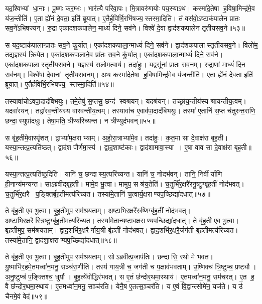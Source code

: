 यद॒श्विभ्यां धा॒नाः।
पू॒ष्णः क॑र॒म्भः।
भार॑त्यै परिवा॒पः।
मि॒त्रावरु॑णयोः पय॒स्याऽथ॑।
कस्मा॑दे॒तेषा ह॒विषा॒मिन्द्र॑मे॒व य॑ज॒न्तीति॑।
ए॒ता ह्ये॑नं दे॒वता॒ इति॑ ब्रूयात्।
ए॒तैर्\mbox{}ह॒विर्भि॒\-रभि॑षज्य॒स्तस्मा॒दिति॑।
तं वस॑वो॒ऽष्टाक॑पालेन प्रातः सव॒ने॑ऽभिषज्यन्।
रु॒द्रा एका॑दशकपालेन॒ माध्यं॑ दिने॒ सव॑ने।
विश्वे॑ दे॒वा द्वाद॑शकपालेन तृतीयसव॒ने॥५३॥

स यद॒ष्टाक॑पालान्प्रातः सव॒ने कु॒र्यात्।
एका॑दशकपाला॒न्माध्यं॑ दिने॒ सव॑ने।
द्वाद॑शकपालास्तृतीयसव॒ने।
विलो॑म॒ तद्य॒ज्ञस्य॑ क्रियेत।
एका॑दशकपालाने॒व प्रा॑तः सव॒ने कु॑र्यात्।
एका॑दशकपाला॒न्माध्यं॑ दिने॒ सव॑ने।
एका॑दशकपाला\-स्तृतीयसव॒ने।
य॒ज्ञस्य॑ सलोम॒त्वाय॑।
तदा॑हुः।
यद्वसू॑नां प्रातः सव॒नम्।
रु॒द्राणां॒ माध्यं॑ दिन॒ सव॑नम्।
विश्वे॑षां दे॒वानां तृतीयसव॒नम्।
अथ॒ कस्मा॑दे॒तेषा ह॒विषा॒मिन्द्र॑मे॒व य॑ज॒न्तीति॑।
ए॒ता ह्ये॑नं दे॒वता॒ इति॑ ब्रूयात्।
ए॒तैर्\-\mbox{}ह॒विर्भि॒रभि॑\-षज्य॒ स्तस्मा॒दिति॑॥५४॥\anuvakamend[ए॒क॒वि॒श आ॑हुस्तृतीयसव॒ने प्रा॑तः सव॒नं पञ्च॑ च]

तस्यावा॑चोऽवपा॒दाद॑बिभयुः।
तमे॒तेषु॑ स॒प्तसु॒ छन्द॑ स्वश्रयन्।
यदश्र॑यन्।
तच्छ्रा॑य॒न्तीय॑स्य श्रायन्तीय॒त्वम्।
यदवा॑रयन्।
तद्वा॑रव॒न्तीय॑स्य वारवन्तीय॒त्वम्।
तस्यावा॑च ए॒वाव॑पा॒दाद॑बिभयुः।
तस्मा॑ ए॒तानि॑ स॒प्त च॑तुरुत्त॒राणि॒ छन्दा॒स्युपा॑दधुः।
तेषा॒मति॒ त्रीण्य॑रिच्यन्त।
न त्रीण्युद॑भवन्॥५५॥

स बृ॑ह॒तीमे॒वास्पृ॑शत्।
द्वाभ्या॑म॒क्षराभ्याम्।
अ॒हो॒रा॒त्राभ्या॑मे॒व।
तदा॑हुः।
क॒त॒मा सा दे॒वाक्ष॑रा बृह॒ती।
यस्या॒न्तत्प्र॒त्यति॑ष्ठत्।
द्वाद॑श पौर्णमा॒स्य॑।
द्वाद॒शाष्ट॑काः।
द्वाद॑शामावा॒स्या।
ए॒षा वाव सा दे॒वाक्ष॑रा बृह॒ती॥५६॥

यस्या॒न्तत्प्र॒त्यति॑ष्ठ॒दिति॑।
यानि॑ च॒ छन्दास्य॒त्यरि॑च्यन्त।
यानि॑ च॒ नोदभ॑वन्।
तानि॒ निर्वीर्याणि ही॒नान्य॑मन्यन्त।
साऽब्र॑वीद्बृह॒ती।
मामे॒व भू॒त्वा।
मामुप॒ सश्र॑य॒तेति॑।
च॒तुर्भि॑र॒क्षरै॑रनु॒ष्टुग्बृ॑ह॒तीं नोद॑भवत्।
च॒तुर्भि॑र॒क्षरै प॒ङ्क्तिर्बृ॑ह॒ती\-मत्य॑रिच्यत।
तस्या॑मे॒तानि॑ च॒त्वार्य॒क्षराण्यप॒च्छिद्या॑\-दधात्॥५७॥

ते बृ॑ह॒ती ए॒व भू॒त्वा।
बृ॒ह॒तीमुप॒ सम॑श्रयताम्।
अ॒ष्टा॒भि\-र॒क्षरै॑रु॒ष्णिग्बृ॑ह॒तीं नोद॑भवत्।
अ॒ष्टा॒भि\-र॒क्षरैस्त्रि॒ष्टुग्बृ॑ह॒ती\-मत्य॑\-रिच्यत।
तस्या॑मे॒तान्य॒ष्टाव॒क्षराण्यप॒च्छिद्या॑\-दधात्।
ते बृ॑ह॒ती ए॒व भू॒त्वा।
बृ॒ह॒तीमुप॒ सम॑श्रयताम्।
द्वा॒द॒शभि॑र॒क्षरैर्गाय॒त्री बृ॑ह॒तीं नोद॑भवत्।
द्वा॒द॒शभि॑र॒क्षरै॒र्जग॑ती बृह॒तीमत्य॑रिच्यत।
तस्या॑मे॒तानि॒ द्वाद॑शा॒क्षराण्यप॒च्छिद्या॑\-दधात्॥५८॥

ते बृ॑ह॒ती ए॒व भू॒त्वा।
बृ॒ह॒तीमुप॒ सम॑श्रयताम्।
सोऽब्रवीत्प्र॒जाप॑तिः।
छन्दासि॒ रथो॑ मे भवत।
यु॒ष्माभि॑र॒हमे॒तमध्वा॑न॒मनु॒ सञ्च॑रा॒णीति॑।
तस्य॑ गाय॒त्री च॒ जग॑ती च प॒क्षाव॑भवताम्।
उ॒ष्णिक्च॑ त्रि॒ष्टुप्च॒ प्रष्ट्यौ।
अ॒नु॒ष्टुप्च॑ प॒ङ्क्तिश्च॒ धुर्यौ।
बृ॒ह॒त्ये॑वोद्धिर॑भवत्।
स ए॒तं छ॑न्दोर॒थमा॒स्थाय॑।
ए॒तमध्वा॑न॒मनु॒ सम॑चरत्।
ए॒त ह॒ वै छ॑न्दोर॒थमा॒स्थाय॑।
ए॒तमध्वा॑न॒मनु॒ सञ्च॑रति।
येनै॒ष ए॒तत्स॒ञ्चर॑ति।
य ए॒वं वि॒द्वान्त्सोमे॑न॒ यज॑ते।
य उ॑ चैनमे॒वं वेद॑॥५९॥\anuvakamend[अ॒भ॒व॒न्वाव सा दे॒वाक्ष॑रा बृह॒त्य॑दधा॒द्द्वाद॑शा॒क्षराण्यप॒च्छिद्या॑दधादा॒स्थाय॒ षट्च॑]






